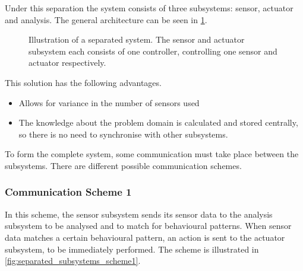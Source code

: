 Under this separation the system consists of three subsystems: sensor, actuator and analysis. The general architecture can be seen in \cref{fig:separated_subsystems}.

\begin{figure}[htbp]
\centering
{}
\caption[Separated system]{Illustration of a separated system. The sensor and actuator subsystem each consists of one controller, controlling one sensor and actuator respectively.}\label{fig:separated_subsystems}
\end{figure}

This solution has the following advantages.

\begin{itemize}
  \item Allows for variance in the number of sensors used
  \item The knowledge about the problem domain is calculated and stored centrally, so there is no need to synchronise with other subsystems.
\end{itemize}

To form the complete system, some communication must take place between the subsystems. There are different possible communication schemes.

\subsubsection{Communication Scheme 1}

In this scheme, the sensor subsystem sends its sensor data to the analysis subsystem to be analysed and to match for behavioural patterns. When sensor data matches a certain behavioural pattern, an action is sent to the actuator subsystem, to be immediately performed. The scheme is illustrated in \cref{fig:separated_subsystems_scheme1}.

